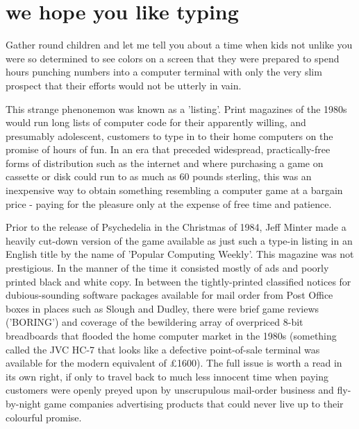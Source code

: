 \chapter{we hope you like typing} 
\label{sec:listing}
\lstset{style=6502Style}
Gather round children and let me tell you about a time when kids not unlike you were
so determined to see colors on a screen that they were prepared to spend hours punching
numbers into a computer terminal with only the very slim prospect that their efforts would not be utterly 
in vain.

This strange phenonemon was known as a 'listing'. Print magazines of the 1980s would run long lists of 
computer code for their apparently willing, and presumably adolescent, customers to type in to their home computers on the promise of
hours of fun. In an era that preceded widespread, practically-free forms of distribution such as the internet and
where purchasing a game on cassette or disk could run to as much as 60 pounds sterling,
this was an inexpensive way to obtain something resembling a computer game at a bargain price - paying for the pleasure
only at the expense of free time and patience.  

Prior to the release of Psychedelia in the Christmas of 1984, Jeff Minter made a heavily cut-down version of the
game available as just such a type-in listing in an English title by the name of 'Popular Computing Weekly'. 
This magazine was not prestigious. In the manner of the time it consisted mostly of ads and poorly printed black
and white copy. In between the tightly-printed classified notices for dubious-sounding software packages available 
for mail order from Post Office boxes in places such as Slough and Dudley, there were brief game reviews ('BORING')
and coverage of the bewildering array of overpriced 8-bit breadboards that flooded the home computer market in the 1980s (something
called the JVC HC-7 that looks like a defective point-of-sale terminal was available for the modern equivalent of £1600). The full issue
is worth a read in its own right, if only to travel back to much less innocent time when paying customers were openly preyed upon
by unscrupulous mail-order business and fly-by-night game companies advertising products that could never live up to their colourful
promise.

